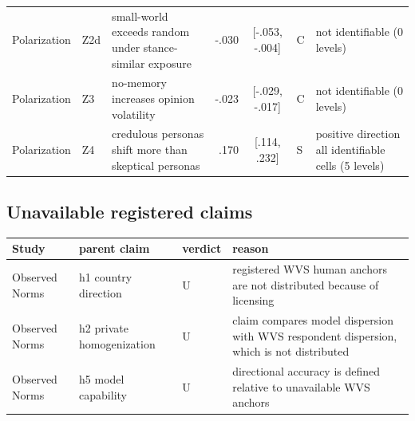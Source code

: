 \documentclass[10pt]{article}
\begin{document}
\begin{landscape}
\begin{longtable}{@{}llp{6.0cm}rclp{5.2cm}@{}}
Polarization & Z2d & small-world exceeds random under stance-similar exposure & -.030 & [-.053, -.004] & C & not identifiable (0 levels) \\
Polarization & Z3 & no-memory increases opinion volatility & -.023 & [-.029, -.017] & C & not identifiable (0 levels) \\
Polarization & Z4 & credulous personas shift more than skeptical personas & .170 & [.114, .232] & S & positive direction all identifiable cells (5 levels) \\
\bottomrule
\end{longtable}
\end{landscape}

\subsection{Unavailable registered claims}
\small
\begin{tabular}{@{}lp{3.7cm}lp{8.6cm}@{}}
\toprule
Study & parent claim & verdict & reason \\
\midrule
Observed Norms & h1 country direction & U & registered WVS human anchors are not distributed because of licensing \\
Observed Norms & h2 private homogenization & U & claim compares model dispersion with WVS respondent dispersion, which is not distributed \\
Observed Norms & h5 model capability & U & directional accuracy is defined relative to unavailable WVS anchors \\
\bottomrule
\end{tabular}
\end{document}
